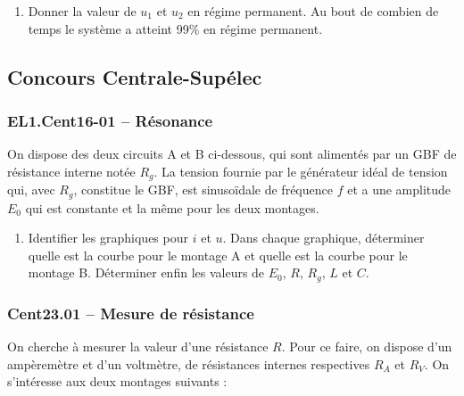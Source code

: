 \begin{center}
\end{center}


\begin{enumerate}
    \item Donner la valeur de $u_1$ et $u_2$ en régime permanent. Au bout de combien de temps le système a atteint 99\% en régime permanent.
\end{enumerate}

\newpage
\subsection*{Concours Centrale-Supélec}
\subsubsection*{EL1.Cent16-01 -- Résonance  \lesdeux}

On dispose des deux circuits A et B ci-dessous, qui sont alimentés par un GBF de résistance interne notée $R_g$. La tension fournie par le générateur idéal de tension qui, avec $R_g$, constitue le GBF, est sinusoïdale de fréquence $f$ et a une amplitude $E_0$ qui est constante et la même pour les deux montages.

\begin{center}
\end{center}


\begin{enumerate}
    \item Identifier les graphiques pour $i$ et $u$. Dans chaque graphique, déterminer quelle est la courbe pour le montage A et quelle est la courbe pour le montage B. Déterminer enfin les valeurs de $E_0$, $R$, $R_g$, $L$ et $C$.
\end{enumerate}

\newpage
\subsubsection*{Cent23.01 -- Mesure de résistance  \lesdeux}

On cherche à mesurer la valeur d'une résistance $R$. Pour ce faire, on dispose d'un ampèremètre et d'un voltmètre, de résistances internes respectives $R_A$ et $R_V$. On s'intéresse aux deux montages suivants :

